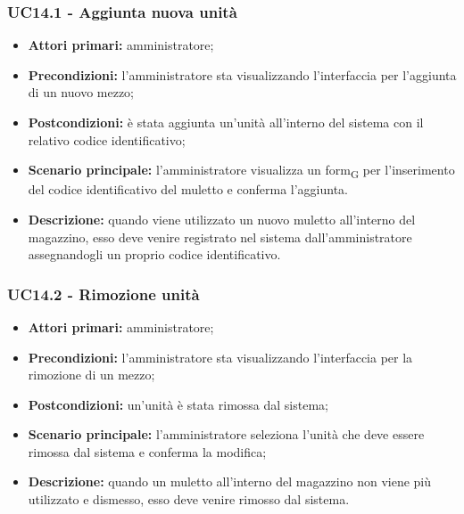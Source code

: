 \subsubsection{UC14.1 - Aggiunta nuova unità}
\begin{itemize}
	\item 	\textbf{Attori primari:} amministratore;
	\item 	\textbf{Precondizioni:} l’amministratore sta visualizzando l’interfaccia per l’aggiunta di un nuovo mezzo;
	\item 	\textbf{Postcondizioni:} è stata aggiunta un’unità all’interno del sistema con il relativo codice identificativo;
	\item 	\textbf{Scenario principale:} l’amministratore visualizza un \gls{form}\textsubscript{G} per l’inserimento del codice identificativo del muletto e conferma l’aggiunta.
	\item 	\textbf{Descrizione:} quando viene utilizzato un nuovo muletto all’interno del magazzino, esso deve venire registrato nel sistema dall’amministratore assegnandogli un proprio codice identificativo.

\end{itemize}


\subsubsection{UC14.2 - Rimozione unità}
\begin{itemize}
	\item 	\textbf{Attori primari:} amministratore;
	\item 	\textbf{Precondizioni:} l’amministratore sta visualizzando l’interfaccia per la rimozione di un mezzo;
	\item 	\textbf{Postcondizioni:} un’unità è stata rimossa dal sistema;
	\item 	\textbf{Scenario principale:} l’amministratore seleziona l’unità che deve essere rimossa dal sistema e conferma la modifica;
	\item 	\textbf{Descrizione:} quando un muletto all’interno del magazzino non viene più utilizzato e dismesso, esso deve venire rimosso dal sistema.
	
\end{itemize}
